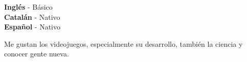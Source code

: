 \documentclass[9pt]{developercv} %
\begin{document}

\begin{minipage}[t]{0.3\textwidth}
	\vspace{-\baselineskip} %

	
	\textbf{Inglés} - Básico\\
	\textbf{Catalán} - Nativo\\
	\textbf{Español} - Nativo\\
\end{minipage}
\hfill
\begin{minipage}[t]{0.3\textwidth}
	\vspace{-\baselineskip} %
	
	
	Me gustan los videojuegos, especialmente su desarrollo, también la ciencia y conocer gente nueva.
	
\end{minipage}
\hfill

\end{document}
